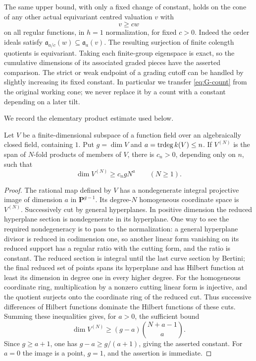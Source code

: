 The same upper bound, with only a fixed change of constant, holds on the
cone of any other actual equivariant centred valuation $v$ with
\begin{equation}\label{eq:G-domination}
                           v\ge c w
\end{equation}
on all regular functions, in $h=1$ normalization, for fixed $c>0$.
Indeed the order ideals satisfy
$\mathfrak a_{a/c}(w)\subseteq\mathfrak a_a(v)$.  The resulting surjection
of finite colength quotients is equivariant.  Taking each finite-group
eigenspace is exact, so the cumulative dimensions of its associated
graded pieces have the asserted comparison.  The strict or weak endpoint
of a grading cutoff can be handled by slightly increasing its fixed
constant.  In particular we transfer \eqref{eq:G-count} from the original
working cone; we never replace it by a count with a constant depending
on a later tilt.

We record the elementary product estimate used below.
\begin{lemma}\label{lem:G-product-growth}
Let $V$ be a finite-dimensional subspace of a function field over an
algebraically closed field, containing $1$.  Put $g=\dim V$ and
$a=\operatorname{trdeg} k(V)\le n$.  If $V^{(N)}$ is the span of $N$-fold products of
members of $V$, there is $c_n>0$, depending only on $n$, such that
\[
                       \dim V^{(N)}\ge c_n gN^a
                       \qquad(N\ge1).
\]
\end{lemma}
\begin{proof}
The rational map defined by $V$ has a nondegenerate integral projective
image of dimension $a$ in $\mathbf P^{g-1}$.  Its degree-$N$ homogeneous
coordinate space is $V^{(N)}$.  Successively cut by general hyperplanes.
In positive dimension the reduced hyperplane section is nondegenerate
in its hyperplane.  One way to see the required nondegeneracy is to pass
to the normalization: a general hyperplane divisor is reduced in
codimension one, so another linear form vanishing on its reduced support
has a regular ratio with the cutting form, and the ratio is constant.
The reduced section is integral until the last curve section by Bertini;
the final reduced set of points spans its hyperplane and has Hilbert
function at least its dimension in degree one in every higher degree.
For the homogeneous coordinate ring, multiplication by a nonzero
cutting linear form is injective, and the quotient surjects onto the
coordinate ring of the reduced cut.  Thus successive differences of
Hilbert functions dominate the Hilbert functions of these cuts.
Summing these inequalities gives, for $a>0$, the sufficient bound
\[
        \dim V^{(N)}\ge(g-a)\binom{N+a-1}{a}.
\]
Since $g\ge a+1$, one has $g-a\ge g/(a+1)$, giving the asserted constant.
For $a=0$ the image is a point, $g=1$, and the assertion is immediate.
\end{proof}

